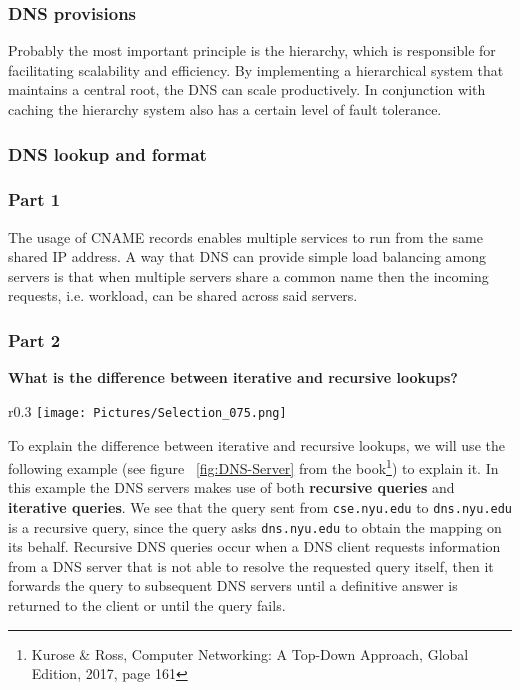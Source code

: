 \documentclass[12pt,a4paper]{article}
\begin{document}
\subsubsection{DNS provisions}
Probably the most important principle is the hierarchy, which is responsible for facilitating scalability and efficiency. By implementing a hierarchical system that maintains a central root, the DNS can scale productively.
In conjunction with caching the hierarchy system also has a certain level of fault tolerance. 

\subsubsection{DNS lookup and format}
\subsubsection*{Part 1}
The usage of CNAME records enables multiple services to run from the same shared IP address. A way that DNS can provide simple load balancing among servers is that when multiple servers share a common name then the incoming requests, i.e. workload, can be shared across said servers. 

\clearpage

\subsubsection*{Part 2}
\textbf{What is the difference between iterative and recursive lookups?}\\
\begin{wrapfigure}{r}{0.3\textwidth} %
    \vspace{-0.5cm}
    \centering
    \texttt{[image: Pictures/Selection\_075.png]}
    \caption{DNS Server: Recursive and iterative queries}
    \label{fig:DNS-Server}
\end{wrapfigure}
To explain the difference between iterative and recursive lookups, we will use the following example (see figure ~\ref{fig:DNS-Server} from the book\footnote{Kurose \& Ross, Computer Networking: A Top-Down Approach, Global Edition, 2017, page 161}) to explain it. In this example the DNS servers makes use of both \textbf{recursive queries} and \textbf{iterative queries}. We see that the query sent from \verb|cse.nyu.edu| to \verb|dns.nyu.edu| is a recursive query, since the query asks \verb|dns.nyu.edu| to obtain the mapping on its behalf. Recursive DNS queries occur when a DNS client requests information from a DNS server that is not able to resolve the requested query itself, then it forwards the query to subsequent DNS servers until a definitive answer is returned to the client or until the query fails.\\
\end{document}

